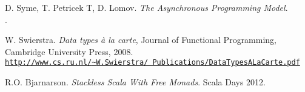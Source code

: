 \begin{thebibliography}{9}
	 D. Syme, T. Petricek T, D. Lomov.
		\emph{The \fsharp{} Asynchronous Programming Model}. \\ 
		.
		
		W. Swierstra. \emph{Data types \`{a} la carte}, Journal of Functional Programming, \\ 	   
		Cambridge University Press, 2008. \\
		\href{http://www.cs.ru.nl/~W.Swierstra/Publications/DataTypesALaCarte.pdf}
			{\texttt{http://www.cs.ru.nl/{\textasciitilde}W.Swierstra/%
						Publications/DataTypesALaCarte.pdf}}
		
		R.O. Bjarnarson. \emph{Stackless Scala With Free Monads}. Scala Days 2012.\\

\end{thebibliography}


